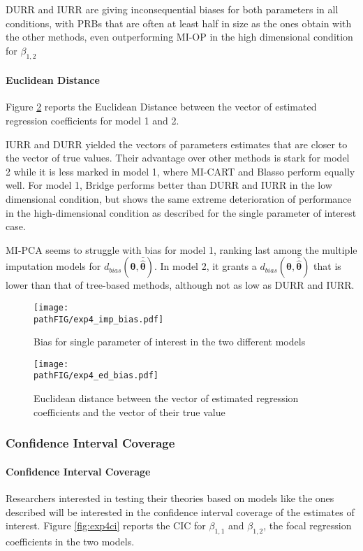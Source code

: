 	DURR and IURR are giving inconsequential biases for both parameters in all conditions, with PRBs that are
	often at least half in size as the ones obtain with the other methods, even outperforming MI-OP in the high 
	dimensional condition for $\beta_{1,2}$

	\paragraph{Euclidean Distance}
	Figure \ref{fig:exp4biased} reports the Euclidean Distance between the vector of estimated regression 
	coefficients for model 1 and 2.

	IURR and DURR yielded the vectors of parameters estimates that are closer to the vector of true values.
	Their advantage over other methods is stark for model 2 while it is less marked in model 1, where MI-CART 
	and Blasso perform equally well. 
	For model 1, Bridge performs better than DURR and IURR in the low dimensional condition, but shows the same 
	extreme deterioration of performance in the high-dimensional condition as described for the single parameter of 
	interest case.

	MI-PCA seems to struggle with bias for model 1, ranking last among the multiple imputation models for
	$d_{bias}(\bm{\theta},\bar{\hat{\bm{\theta}}})$.
	In model 2, it grants a $d_{bias}(\bm{\theta},\bar{\hat{\bm{\theta}}})$ that is lower than that of 
	tree-based methods, although not as low as DURR and IURR.

\begin{figure}
	\centering
	\texttt{[image: \\pathFIG/exp4\_imp\_bias.pdf]}
	\caption{Bias for single parameter of interest in the two different models}
	\label{fig:exp4bias}
\end{figure}

\begin{figure}
	\centering
	\texttt{[image: \\pathFIG/exp4\_ed\_bias.pdf]}
	\caption{Euclidean distance between the vector of estimated regression coefficients and
		the vector of their true value}
	\label{fig:exp4biased}
\end{figure}


\subsubsection{Confidence Interval Coverage}

	\paragraph{Confidence Interval Coverage}
	Researchers interested in testing their theories based on models like the ones described will be interested
	in the confidence interval coverage of the estimates of interest.
	Figure \ref{fig:exp4ci} reports the CIC for $\beta_{1,1}$ and $\beta_{1,2}$, the focal regression coefficients 
	in the two models.

